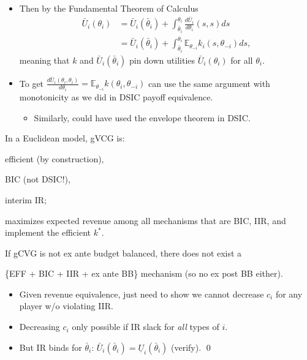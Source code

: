 \documentclass[english,handout]{beamer}		%
\def\lyxframeend{} %
\begin{document}
\begin{itemize}
	\item Then by the Fundamental Theorem of Calculus
	\begin{align*}
		\bar{U}_i (\theta_i) &= \bar{U}_i (\bar{\theta}_i) + \int_{\bar{\theta}_i}^{\theta_i} \frac{d \bar{U}_i}{d \theta_i}(s,s) d s
		\\&= \bar{U}_i (\bar{\theta}_i) + \int_{\bar{\theta}_i}^{\theta_i} \mathbb{E}_{\theta_{-i}} k_i(s,\theta_{-i}) d s,
	\end{align*}
	meaning that $k$ and $\bar{U}_i (\bar{\theta}_i)$ pin down utilities $\bar{U}_i (\theta_i)$ for all $\theta_i$.
	\item To get $\frac{d \bar{U}_i (\theta_i,\theta_{i})}{d \theta_i} = \mathbb{E}_{\theta_{-i}} k(\theta_i,\theta_{-i})$ can use the same argument with monotonicity as we did in DSIC payoff equivalence.
	\begin{itemize}
		\item Similarly, could have used the envelope theorem in DSIC.
	\end{itemize}
\end{itemize}
\lyxframeend


\begin{theorem}
	In a \alert{Euclidean} model, gVCG is:
	\begin{itemize}{\color{gray}
		\item efficient (by construction),
		\item BIC (not DSIC!),
		\item interim IR;}
		\item maximizes expected revenue among all mechanisms that are BIC, IIR, and implement the efficient $k^*$.
	\end{itemize}
\end{theorem}
If gCVG is not ex ante budget balanced, there does not exist a 

\{EFF + BIC + IIR + ex ante BB\} mechanism (so no ex post BB either).
\lyxframeend


\begin{itemize}
	\item Given revenue equivalence, just need to show we cannot decrease $c_i$ for any player w/o violating IIR.
	\pause
	\item Decreasing $c_i$ only possible if IR slack for \emph{all} types of $i$.
	\pause
	\item But IR binds for $\bar{\theta}_i$: $\bar{U}_i (\bar{\theta}_i) = \underline{U}_i (\bar{\theta}_i)$ (verify). \qed
\end{itemize}
\lyxframeend
\end{document}
